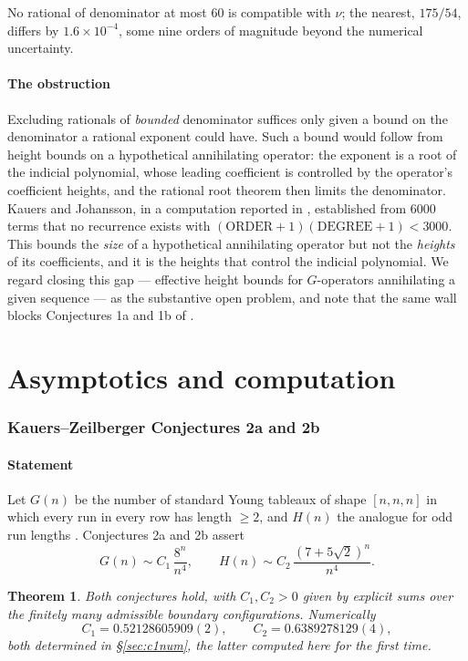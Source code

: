 \documentclass[11pt]{article}
\newtheorem{theorem}{Theorem}[section]
\theoremstyle{definition}
\begin{document}
No rational of denominator at most $60$ is compatible with $\nu$; the nearest,
$175/54$, differs by $1.6\times10^{-4}$, some nine orders of magnitude beyond
the numerical uncertainty.

\subsection{The obstruction}

Excluding rationals of \emph{bounded} denominator suffices only given a bound
on the denominator a rational exponent could have. Such a bound would follow
from height bounds on a hypothetical annihilating operator: the exponent is a
root of the indicial polynomial, whose leading coefficient is controlled by the
operator's coefficient heights, and the rational root theorem then limits the
denominator. Kauers and Johansson, in a computation reported in \cite[Feb.~28, 2012
update]{EZssyt}, established from $6000$ terms that no recurrence exists with
$(\mathrm{ORDER}+1)(\mathrm{DEGREE}+1)<3000$. This bounds the \emph{size} of a
hypothetical annihilating operator but not the \emph{heights} of its
coefficients, and it is the heights that control the indicial polynomial.
We regard closing this gap --- effective height bounds for $G$-operators
annihilating a given sequence --- as the substantive open problem, and note
that the same wall blocks Conjectures 1a and 1b of \cite{KZ}.

\part{Asymptotics and computation}

\section{Kauers--Zeilberger Conjectures 2a and 2b}\label{sec:kz}

\subsection{Statement}

Let $G(n)$ be the number of standard Young tableaux of shape $[n,n,n]$ in which
every run in every row has length $\ge2$, and $H(n)$ the analogue for odd run
lengths \cite{KZ}. Conjectures 2a and 2b assert
\[
  G(n)\sim C_1\,\frac{8^{n}}{n^{4}},\qquad
  H(n)\sim C_2\,\frac{(7+5\sqrt2)^{n}}{n^{4}} .
\]

\begin{theorem}\label{thm:kz}
Both conjectures hold, with $C_1,C_2>0$ given by explicit sums over the
finitely many admissible boundary configurations. Numerically
\[
  C_1=0.52128605909(2),\qquad C_2=0.6389278129(4),
\]
both determined in \S\ref{sec:c1num}, the latter computed here for the first
time.
\end{theorem}
\end{document}
